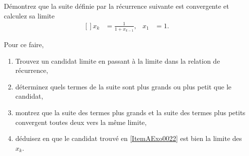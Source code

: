 
\begin{exercice}\label{exo0022}


Démontrez que la suite définie par la récurrence suivante est convergente et calculez sa limite
\begin{equation}
	\begin{aligned}[]
		x_k &= \frac{1}{1 + x_{k-1}}, &x_1 &= 1.
	\end{aligned}
\end{equation}

Pour ce faire, 
\begin{enumerate}
\item\label{ItemAExo0022} Trouvez un candidat limite en passant à la limite dans la relation de récurrence,
\item déterminez quels termes de la suite sont plus grands ou plus petit que le candidat,
\item montrez que la suite des termes plus grands et la suite des termes plus petits convergent toutes deux vers la même limite,
\item déduisez en que le candidat trouvé en \ref{ItemAExo0022} est bien la limite des $x_k$.
\end{enumerate}

\end{exercice} 
